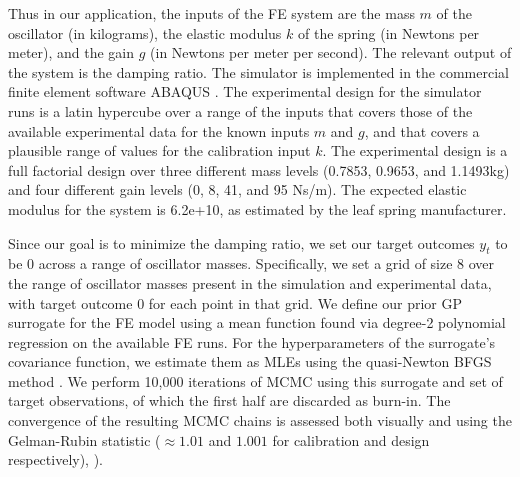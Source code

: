 \documentclass[twocolumn,10pt]{asme2ej}
\begin{document}
%
Thus in our application, the inputs of the FE system are the mass $m$ of the oscillator (in kilograms), the elastic modulus $k$ of the spring (in Newtons per meter), and the gain $g$ (in Newtons per meter per second).
%
The relevant output of the system is the damping ratio.
%
The simulator is implemented in the commercial finite element software ABAQUS \cite{Abaqus2012}.
%
The experimental design for the simulator runs is a latin hypercube over a range of the inputs that covers those of the available experimental data for the known inputs $m$ and $g$, and that covers a plausible range of values for the calibration input $k$.
%
The experimental design is a full factorial design over three different mass levels (0.7853, 0.9653, and 1.1493kg) and four different gain levels (0, 8, 41, and 95 Ns/m).
%
The expected elastic modulus for the system is 6.2e+10, as estimated by the leaf spring manufacturer.
%

%
Since our goal is to minimize the damping ratio, we set our target outcomes $y_t$ to be 0 across a range of oscillator masses.
%
Specifically, we set a grid of size 8 over the range of oscillator masses present in the simulation and experimental data, with target outcome 0 for each point in that grid.
%
We define our prior GP surrogate for the FE model using a mean function found via degree-2 polynomial regression on the available FE runs.
%
For the hyperparameters of the surrogate's covariance function, we estimate them as MLEs using the quasi-Newton BFGS method \cite{Fletcher2013}.
%
We perform 10,000 iterations of MCMC using this surrogate and set of target observations, of which the first half are discarded as burn-in.
%
The convergence of the resulting MCMC chains is assessed both visually and using the Gelman-Rubin statistic ($\approx1.01$ and $1.001$ for calibration and design respectively), \cite{Gelman1992a}).
%
\end{document}
